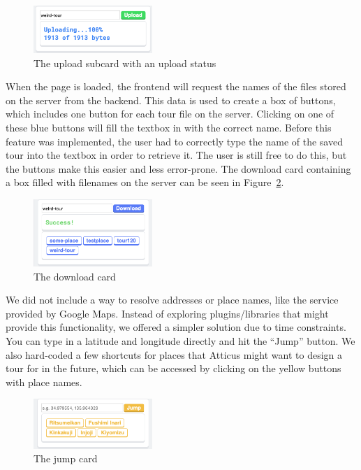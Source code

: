 \documentclass[a4paper, 10pt, american, titlepage]{article}
\begin{document}
\begin{figure}[h]
	\centering
    \includegraphics[width=0.4\textwidth]{uploading-message-editour.png}
    \caption{The upload subcard with an upload status}
	\label{fig:uploadingMessage}
\end{figure}

When the page is loaded, the frontend will request the names of the files
stored on the server from the backend. This data is used to create a box of
buttons, which includes one button for each tour file on the server. Clicking
on one of these blue buttons will fill the textbox in with the correct name.
Before this feature was implemented, the user had to correctly type the name of
the saved tour into the textbox in order to retrieve it. The user is still free
to do this, but the buttons make this easier and less error-prone. The download
card containing a box filled with filenames on the server can be seen in
Figure~\ref{fig:downloadCard}.

\begin{figure}[h]
	\centering
    \includegraphics[width=0.4\textwidth]{download-card-editour.png}
    \caption{The download card}
	\label{fig:downloadCard}
\end{figure}

We did not include a way to resolve addresses or place names, like the service
provided by Google Maps. Instead of exploring plugins/libraries that might
provide this functionality, we offered a simpler solution due to time
constraints.  You can type in a latitude and longitude directly and hit the
``Jump'' button. We also hard-coded a few shortcuts for places that Atticus
might want to design a tour for in the future, which can be accessed by
clicking on the yellow buttons with place names.

\begin{figure}[h]
	\centering
    \includegraphics[width=0.4\textwidth]{jump-card-editour.png}
    \caption{The jump card}
	\label{fig:jumpCard}
\end{figure}
\end{document}
